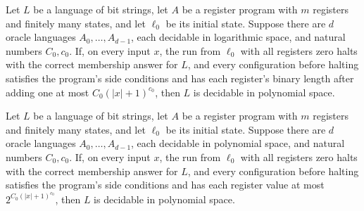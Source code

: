 \begin{theorem}
\label{Complexity.LogProg.arm_decides_pspace_of_logspace}
\leanok
{}
Let $L$ be a language of bit strings, let $A$ be a register program with $m$ registers
and finitely many states, and let $\ell_0$ be its initial state. Suppose there are $d$
oracle languages $A_0,\ldots,A_{d-1}$, each decidable in logarithmic space, and natural
numbers $C_0,c_0$. If, on every input $x$, the run from $\ell_0$ with all registers zero
halts with the correct membership answer for $L$, and every configuration before halting
satisfies the program's side conditions and has each register's binary length after
adding one at most $C_0(|x|+1)^{c_0}$, then $L$ is decidable in polynomial space.
\end{theorem}

\begin{theorem}
\label{Complexity.LogProg.arm_decides_pspace_val}
\leanok
{}
Let $L$ be a language of bit strings, let $A$ be a register program with $m$ registers
and finitely many states, and let $\ell_0$ be its initial state. Suppose there are $d$
oracle languages $A_0,\ldots,A_{d-1}$, each decidable in polynomial space, and natural
numbers $C_0,c_0$. If, on every input $x$, the run from $\ell_0$ with all registers zero
halts with the correct membership answer for $L$, and every configuration before halting
satisfies the program's side conditions and has each register value at most
$2^{C_0(|x|+1)^{c_0}}$, then $L$ is decidable in polynomial space.
\end{theorem}
